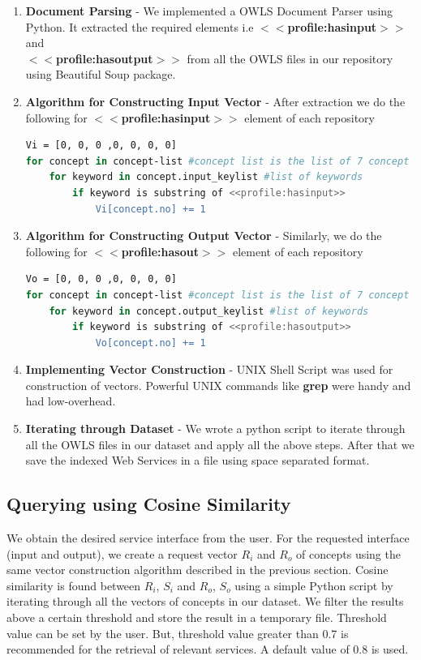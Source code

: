 \documentclass[12pt, twoside]{book}
\begin{document}
\begin{enumerate}
 \item \textbf{Document Parsing} - We implemented a OWLS Document Parser using Python. It extracted the required elements i.e \textbf{$<<$profile:hasinput$>>$} and \\ \textbf{$<<$profile:hasoutput$>>$} from all the OWLS files in our repository using Beautiful Soup package.
   \item \textbf{Algorithm for Constructing Input Vector} - After extraction we do the following for \textbf{$<<$profile:hasinput$>>$} element of each repository
   \begin{lstlisting}[language = bash, style = mystyle]
Vi = [0, 0, 0 ,0, 0, 0, 0]
for concept in concept-list #concept list is the list of 7 concept
	for keyword in concept.input_keylist #list of keywords
		if keyword is substring of <<profile:hasinput>>
			Vi[concept.no] += 1\end{lstlisting}
	\item \textbf{Algorithm for Constructing Output Vector} - Similarly, we do the following for \textbf{$<<$profile:hasout$>>$} element of each repository
   \begin{lstlisting}[language = bash, style = mystyle]
Vo = [0, 0, 0 ,0, 0, 0, 0]
for concept in concept-list #concept list is the list of 7 concept
	for keyword in concept.output_keylist #list of keywords
		if keyword is substring of <<profile:hasoutput>>
			Vo[concept.no] += 1 \end{lstlisting}
	\item \textbf{Implementing Vector Construction} -  UNIX Shell Script was used for construction of vectors. Powerful UNIX commands like \textbf{grep} were handy and had low-overhead.
	\item \textbf{Iterating through Dataset} - We wrote a python script to iterate through all the OWLS files in our dataset and apply all the above steps. After that we save the indexed Web Services in a file using space separated format.
\end{enumerate}

\subsection{Querying using Cosine Similarity}
We obtain the desired service interface from the user. For the requested interface (input and output), we create a request vector $R_i$ and $R_{o}$ of concepts using the same vector construction algorithm described in the previous section. Cosine similarity is found between $R_{i}$, $S_{i}$ and $R_{o}$, $S_{o}$ using a simple Python script by iterating through all the vectors of concepts in our dataset. We filter the results above a certain threshold and store the result in a temporary file.  Threshold value can be set by the user. But, threshold value greater than 0.7 is recommended for the retrieval of relevant services. A default value of 0.8 is used.
\end{document}
